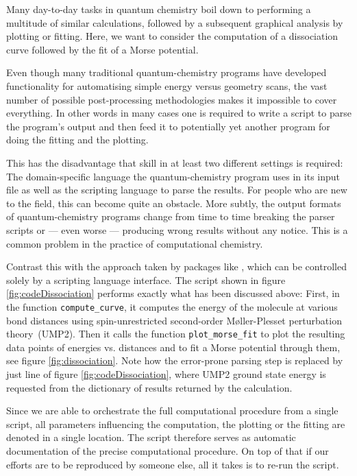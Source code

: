 Many day-to-day tasks in quantum chemistry boil down to
performing a multitude of similar calculations,
followed by a subsequent graphical analysis
by plotting or fitting.
Here, we want to consider the computation of a dissociation curve
followed by the fit of a Morse potential.

Even though many traditional quantum-chemistry programs
have developed functionality for automatising simple
energy versus geometry scans,
the vast number of possible post-processing methodologies
makes it impossible to cover everything.
In other words in many cases one is required to write a script
to parse the program's output and then feed it to potentially yet
another program for doing the fitting and the plotting.

This has the disadvantage
that skill in at least two different settings is required:
The domain-specific language the quantum-chemistry program uses
in its input file as well as the scripting language to parse the results.
For people who are new to the field, this can become quite an obstacle.
More subtly, the output formats
of quantum-chemistry programs change from time to time
breaking the parser scripts or --- even worse ---
producing wrong results without any notice.
This is a common problem in the practice of computational chemistry.

Contrast this with the approach taken by packages like \molsturm,
which can be controlled solely by a scripting language interface.
The \python script shown in figure \ref{fig:codeDissociation} performs
exactly what has been discussed above:
First, in the function \texttt{compute\_curve},
it computes the energy of the  molecule
at various bond distances using spin-unrestricted
second-order Møller-Plesset perturbation theory~(UMP2).
Then it calls the function \texttt{plot\_morse\_fit}
to plot the resulting data points of energies vs. distances
and to fit a Morse potential through them,
see figure \ref{fig:dissociation}.
Note how the error-prone parsing step is replaced by just
line \lextract of figure \ref{fig:codeDissociation},
where UMP2 ground state energy is requested from the
dictionary of results returned by the calculation.

Since we are able to orchestrate the full computational procedure
from a single script,
all parameters influencing the computation, the plotting or the fitting
are denoted in a single location.
The script therefore serves as automatic documentation
of the precise computational procedure.
On top of that if our efforts are to be reproduced by someone else,
all it takes is to re-run the script.

